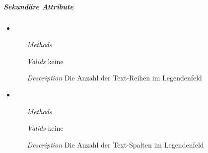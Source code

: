 
\newpage

\subparagraph{Sekund\"are Attribute}
\begin{itemize}
  
\item {}
\begin{enumerate}
\item[\textit{Methods}] 
\item[\textit{Valids}] keine
\item[\textit{Description}] Die Anzahl der Text-Reihen im Legendenfeld
\end{enumerate}

\item {}
\begin{enumerate}
\item[\textit{Methods}] 
\item[\textit{Valids}] keine
\item[\textit{Description}] Die Anzahl der Text-Spalten im
  Legendenfeld
\end{enumerate}

\end{itemize}


\newpage

